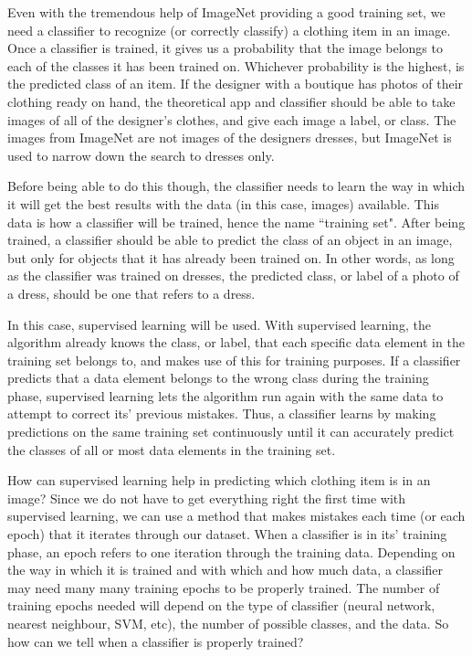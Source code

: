 \documentclass[12pt]{report} %
\begin{document}
	Even with the tremendous help of ImageNet\cite{ImageNet} providing a good training set, we need a classifier to recognize (or correctly classify) a clothing item in an image. Once a classifier is trained, it gives us a probability that the image belongs to each of the classes it has been trained on. Whichever probability is the highest, is the predicted class of an item\cite{KubatMachineLearn}. If the designer with a boutique has photos of their clothing ready on hand, the theoretical app and classifier should be able to take images of all of the designer's clothes, and give each image a label, or class. The images from ImageNet are not images of the designers dresses, but ImageNet is used to narrow down the search to dresses only.
	
	Before being able to do this though, the classifier needs to learn the way in which it will get the best results with the data (in this case, images) available. This data is how a classifier will be trained, hence the name ``training set". After being trained, a classifier should be able to predict the class of an object in an image, but only for objects that it has already been trained on. In other words, as long as the classifier was trained on dresses, the predicted class, or label of a photo of a dress, should be one that refers to a dress. 
	
	In this case, supervised learning will be used. With supervised learning, the algorithm already knows the class, or label, that each specific data element in the training set belongs to, and makes use of this for training purposes. If a classifier predicts that a data element belongs to the wrong class during the training phase, supervised learning lets the algorithm run again with the same data to attempt to correct its' previous mistakes\cite{aurelienMachineLearning}. Thus, a classifier learns by making predictions on the same training set continuously until it can accurately predict the classes of all or most data elements in the training set. 
	
	How can supervised learning help in predicting which clothing item is in an image? Since we do not have to get everything right the first time with supervised learning, we can use a method that makes mistakes each time (or each epoch) that it iterates through our dataset. When a classifier is in its' training phase, an epoch refers to one iteration through the training data. Depending on the way in which it is trained and with which and how much data, a classifier may need many many training epochs to be properly trained. The number of training epochs needed will depend on the  type of classifier (neural network, nearest neighbour, SVM, etc), the number of possible classes, and the data. So how can we tell when a classifier is properly trained? 
	
\end{document}
